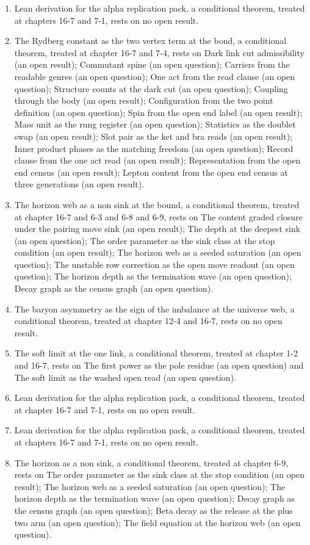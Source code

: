 \begin{enumerate}
\item Lean derivation for the alpha replication pack, a conditional theorem, treated at chapters 16-7 and 7-1, rests on no open result.
\item The Rydberg constant as the two vertex term at the bond, a conditional theorem, treated at chapter 16-7 and 7-4, rests on Dark link cut admissibility (an open result); Commutant spine (an open question); Carriers from the readable genres (an open question); One act from the read clause (an open question); Structure counts at the dark cut (an open question); Coupling through the body (an open result); Configuration from the two point definition (an open question); Spin from the open end label (an open result); Mass unit as the rung register (an open question); Statistics as the doublet swap (an open result); Slot pair as the ket and bra reads (an open result); Inner product phases as the matching freedom (an open question); Record clause from the one act read (an open result); Representation from the open end census (an open result); Lepton content from the open end census at three generations (an open result).
\item The horizon web as a non sink at the bound, a conditional theorem, treated at chapter 16-7 and 6-3 and 6-8 and 6-9, rests on The content graded closure under the pairing move sink (an open result); The depth at the deepest sink (an open question); The order parameter as the sink class at the stop condition (an open result); The horizon web as a seeded saturation (an open question); The unstable row correction as the open move readout (an open question); The horizon depth as the termination wave (an open question); Decay graph as the census graph (an open question).
\item The baryon asymmetry as the sign of the imbalance at the universe web, a conditional theorem, treated at chapter 12-4 and 16-7, rests on no open result.
\item The soft limit at the one link, a conditional theorem, treated at chapter 1-2 and 16-7, rests on The first power as the pole residue (an open question) and The soft limit as the washed open read (an open question).
\item Lean derivation for the alpha replication pack, a conditional theorem, treated at chapter 16-7 and 7-1, rests on no open result.
\item Lean derivation for the alpha replication pack, a conditional theorem, treated at chapters 16-7 and 7-1, rests on no open result.
\item The horizon as a non sink, a conditional theorem, treated at chapter 6-9, rests on The order parameter as the sink class at the stop condition (an open result); The horizon web as a seeded saturation (an open question); The horizon depth as the termination wave (an open question); Decay graph as the census graph (an open question); Beta decay as the release at the plus two arm (an open question); The field equation at the horizon web (an open question).

\end{enumerate}
